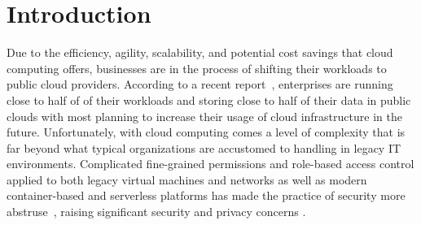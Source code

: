 \documentclass[sigconf]{acmart}
\begin{document}
\section{Introduction}

Due to the efficiency, agility, scalability, and potential cost savings that
cloud computing offers, businesses are in the process of shifting their workloads
to public cloud providers. According to a recent report~\cite{Flexera2020}, enterprises are running close to half of of their workloads and storing close to half of their data in public clouds with most planning to increase their usage of cloud infrastructure in the future.
Unfortunately, with cloud computing comes a level of complexity that is far beyond what
typical organizations are accustomed to handling in legacy IT environments.
Complicated fine-grained permissions and role-based access control applied to both legacy 
virtual machines and networks as well as modern container-based and serverless platforms has 
made the practice of security more abstruse~\cite{Sharrm}, raising significant
security and privacy concerns \cite{Takabi2010}.
\end{document}
